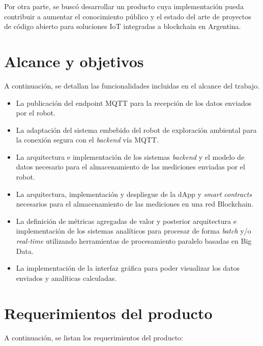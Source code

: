 Por otra parte, se buscó desarrollar un producto cuya implementación pueda contribuir a aumentar el conocimiento público y el estado del arte de proyectos de código abierto para soluciones IoT integradas a blockchain en Argentina.


\section{Alcance y objetivos}

A continuación, se detallan las funcionalidades incluidas en el alcance del trabajo.


\begin{itemize}
	\item La publicación del endpoint MQTT \citep{mqtt_spec} para la recepción de los datos enviados por el robot.
	\item La adaptación del sistema embebido del robot de exploración ambiental para la conexión segura con el \textit{backend} vía MQTT.
	\item La arquitectura e implementación de los sistemas \textit{backend} y el modelo de datos necesario para el almacenamiento de las mediciones enviadas por el robot.
	\item La arquitectura, implementación y despliegue de la dApp \citep{dapp} y \textit{smart contracts} \citep{smart_contracts} necesarios para el almacenamiento de las mediciones en una red Blockchain.
	\item La definición de métricas agregadas de valor y posterior arquitectura e implementación de los sistemas analíticos para procesar de forma \textit{batch} y/o \textit{real-time} utilizando herramientas de procesamiento paralelo basadas en Big Data.
	\item La implementación de la interfaz gráfica para poder visualizar los datos enviados y analíticas calculadas.

\end{itemize}




\section{Requerimientos del producto}


A continuación, se listan los requerimientos del producto:

